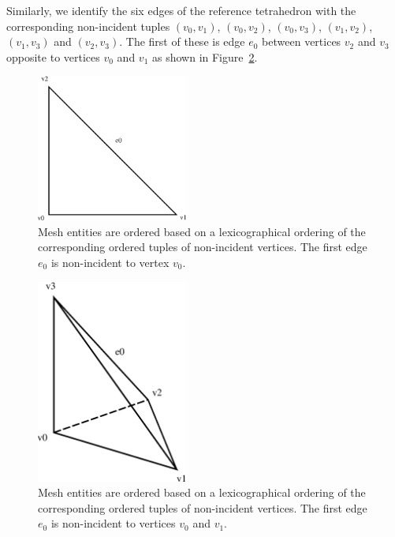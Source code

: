 Similarly, we identify the six edges of the reference tetrahedron with
the corresponding non-incident tuples $(v_0, v_1)$, $(v_0, v_2)$,
$(v_0, v_3)$, $(v_1, v_2)$, $(v_1, v_3)$ and $(v_2, v_3)$. The first of these is
edge $e_0$ between vertices $v_2$ and $v_3$ opposite to vertices $v_0$
and $v_1$ as shown in Figure~\ref{fig:orderingexample,tetrahedron}.

\begin{figure}[htbp]
  \begin{center}
    \includegraphics[width=5cm]{eps/ordering_example_triangle.eps}
    \caption{Mesh entities are ordered based on a lexicographical ordering
      of the corresponding ordered tuples of non-incident vertices.
      The first edge $e_0$ is non-incident to vertex $v_0$.}
    \label{fig:orderingexample,triangle}
  \end{center}
\end{figure}

\begin{figure}[htbp]
  \begin{center}
    \includegraphics[width=5cm]{eps/ordering_example_tetrahedron.eps}
    \caption{Mesh entities are ordered based on a lexicographical ordering
      of the corresponding ordered tuples of non-incident vertices.
      The first edge $e_0$ is non-incident to vertices $v_0$ and $v_1$.}
    \label{fig:orderingexample,tetrahedron}
  \end{center}
\end{figure}

